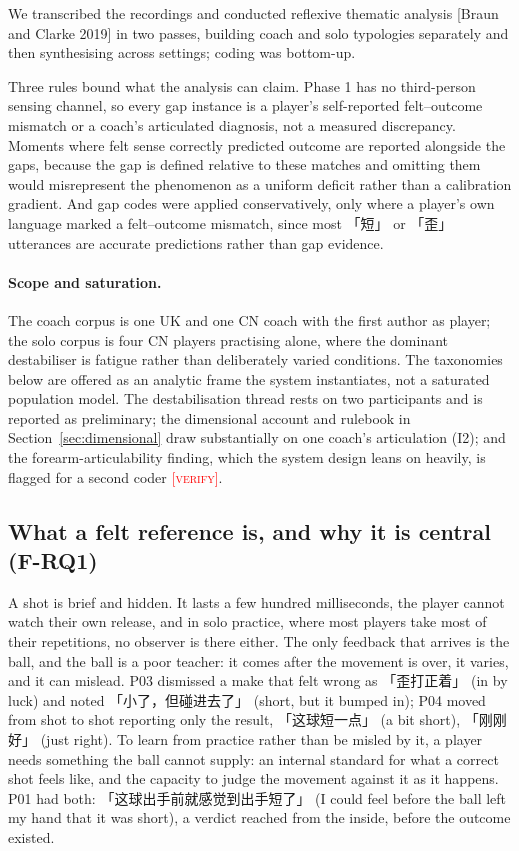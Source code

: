 \documentclass[sigconf]{acmart}
\newcommand{\vf}[1]{\textcolor{red}{[\textsc{#1}]}}
\begin{document}
We transcribed the recordings and conducted reflexive thematic analysis [Braun and Clarke 2019] in two passes, building coach and solo typologies separately and then synthesising across settings; coding was bottom-up.

Three rules bound what the analysis can claim. Phase 1 has no third-person sensing channel, so every gap instance is a player's self-reported felt--outcome mismatch or a coach's articulated diagnosis, not a measured discrepancy. Moments where felt sense correctly predicted outcome are reported alongside the gaps, because the gap is defined relative to these matches and omitting them would misrepresent the phenomenon as a uniform deficit rather than a calibration gradient. And gap codes were applied conservatively, only where a player's own language marked a felt--outcome mismatch, since most 「短」 or 「歪」 utterances are accurate predictions rather than gap evidence.

\paragraph{Scope and saturation.} The coach corpus is one UK and one CN coach with the first author as player; the solo corpus is four CN players practising alone, where the dominant destabiliser is fatigue rather than deliberately varied conditions. The taxonomies below are offered as an analytic frame the system instantiates, not a saturated population model. The destabilisation thread rests on two participants and is reported as preliminary; the dimensional account and rulebook in Section~\ref{sec:dimensional} draw substantially on one coach's articulation (I2); and the forearm-articulability finding, which the system design leans on heavily, is flagged for a second coder \vf{verify}.

\subsection{What a felt reference is, and why it is central (F-RQ1)}

A shot is brief and hidden. It lasts a few hundred milliseconds, the player cannot watch their own release, and in solo practice, where most players take most of their repetitions, no observer is there either. The only feedback that arrives is the ball, and the ball is a poor teacher: it comes after the movement is over, it varies, and it can mislead. P03 dismissed a make that felt wrong as 「歪打正着」 (in by luck) and noted 「小了，但碰进去了」 (short, but it bumped in); P04 moved from shot to shot reporting only the result, 「这球短一点」 (a bit short), 「刚刚好」 (just right). To learn from practice rather than be misled by it, a player needs something the ball cannot supply: an internal standard for what a correct shot feels like, and the capacity to judge the movement against it as it happens. P01 had both: 「这球出手前就感觉到出手短了」 (I could feel before the ball left my hand that it was short), a verdict reached from the inside, before the outcome existed.
\end{document}
